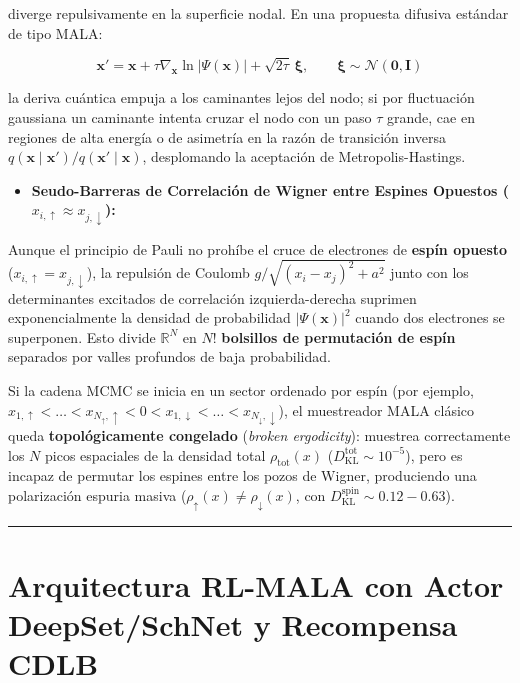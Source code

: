 \documentclass[10pt,a4paper]{article}
\begin{document}
   diverge repulsivamente en la superficie nodal. En una propuesta difusiva estándar de tipo MALA:

\[
   \mathbf{x}' = \mathbf{x} + \tau \nabla_{\mathbf{x}} \ln |\Psi(\mathbf{x})| + \sqrt{2\tau}\,\boldsymbol{\xi}, \qquad \boldsymbol{\xi} \sim \mathcal{N}(\mathbf{0}, \mathbf{I})
\]

   la deriva cuántica empuja a los caminantes lejos del nodo; si por fluctuación gaussiana un caminante intenta cruzar el nodo con un paso $\tau$ grande, cae en regiones de alta energía o de asimetría en la razón de transición inversa $q(\mathbf{x} \mid \mathbf{x}') / q(\mathbf{x}' \mid \mathbf{x})$, desplomando la aceptación de Metropolis-Hastings.



\begin{itemize}
\item \textbf{Seudo-Barreras de Correlación de Wigner entre Espines Opuestos ($x_{i,\uparrow} \approx x_{j,\downarrow}$):}
\end{itemize}

   Aunque el principio de Pauli no prohíbe el cruce de electrones de \textbf{espín opuesto} ($x_{i,\uparrow} = x_{j,\downarrow}$), la repulsión de Coulomb $g / \sqrt{(x_i - x_j)^2 + a^2}$ junto con los determinantes excitados de correlación izquierda-derecha suprimen exponencialmente la densidad de probabilidad $|\Psi(\mathbf{x})|^2$ cuando dos electrones se superponen. Esto divide $\mathbb{R}^N$ en $N!$ \textbf{bolsillos de permutación de espín} separados por valles profundos de baja probabilidad.

   Si la cadena MCMC se inicia en un sector ordenado por espín (por ejemplo, $x_{1,\uparrow} < \dots < x_{N_\uparrow,\uparrow} < 0 < x_{1,\downarrow} < \dots < x_{N_\downarrow,\downarrow}$), el muestreador MALA clásico queda \textbf{topológicamente congelado} (\textit{broken ergodicity}): muestrea correctamente los $N$ picos espaciales de la densidad total $\rho_{\mathrm{tot}}(x)$ ($D_{\mathrm{KL}}^{\mathrm{tot}} \sim 10^{-5}$), pero es incapaz de permutar los espines entre los pozos de Wigner, produciendo una polarización espuria masiva ($\rho_\uparrow(x) \neq \rho_\downarrow(x)$, con $D_{\mathrm{KL}}^{\mathrm{spin}} \sim 0.12 - 0.63$).




\vspace{0.4cm}\hrule\vspace{0.4cm}




\section{Arquitectura RL-MALA con Actor DeepSet/SchNet y Recompensa CDLB}
\end{document}
